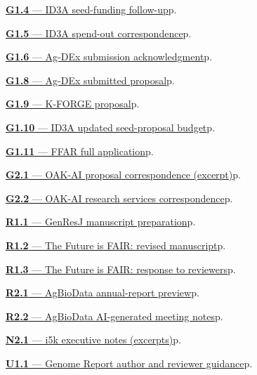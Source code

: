 \noindent\hyperref[supplement-G1.4]{\textbf{G1.4} --- ID3A seed-funding follow-up}\hfill p.~\pageref{supplement-G1.4}\par
\noindent\hyperref[supplement-G1.5]{\textbf{G1.5} --- ID3A spend-out correspondence}\hfill p.~\pageref{supplement-G1.5}\par
\noindent\hyperref[supplement-G1.6]{\textbf{G1.6} --- Ag-DEx submission acknowledgment}\hfill p.~\pageref{supplement-G1.6}\par
\noindent\hyperref[supplement-G1.8]{\textbf{G1.8} --- Ag-DEx submitted proposal}\hfill p.~\pageref{supplement-G1.8}\par
\noindent\hyperref[supplement-G1.9]{\textbf{G1.9} --- K-FORGE proposal}\hfill p.~\pageref{supplement-G1.9}\par
\noindent\hyperref[supplement-G1.10]{\textbf{G1.10} --- ID3A updated seed-proposal budget}\hfill p.~\pageref{supplement-G1.10}\par
\noindent\hyperref[supplement-G1.11]{\textbf{G1.11} --- FFAR full application}\hfill p.~\pageref{supplement-G1.11}\par
\noindent\hyperref[supplement-G2.1]{\textbf{G2.1} --- OAK-AI proposal correspondence (excerpt)}\hfill p.~\pageref{supplement-G2.1}\par
\noindent\hyperref[supplement-G2.2]{\textbf{G2.2} --- OAK-AI research services correspondence}\hfill p.~\pageref{supplement-G2.2}\par
\noindent\hyperref[supplement-R1.1]{\textbf{R1.1} --- GenResJ manuscript preparation}\hfill p.~\pageref{supplement-R1.1}\par
\noindent\hyperref[supplement-R1.2]{\textbf{R1.2} --- The Future is FAIR: revised manuscript}\hfill p.~\pageref{supplement-R1.2}\par
\noindent\hyperref[supplement-R1.3]{\textbf{R1.3} --- The Future is FAIR: response to reviewers}\hfill p.~\pageref{supplement-R1.3}\par
\noindent\hyperref[supplement-R2.1]{\textbf{R2.1} --- AgBioData annual-report preview}\hfill p.~\pageref{supplement-R2.1}\par
\noindent\hyperref[supplement-R2.2]{\textbf{R2.2} --- AgBioData AI-generated meeting notes}\hfill p.~\pageref{supplement-R2.2}\par
\noindent\hyperref[supplement-N2.1]{\textbf{N2.1} --- i5k executive notes (excerpts)}\hfill p.~\pageref{supplement-N2.1}\par

\noindent\hyperref[supplement-U1.1]{\textbf{U1.1} --- Genome Report author and reviewer guidance}\hfill p.~\pageref{supplement-U1.1}\par
